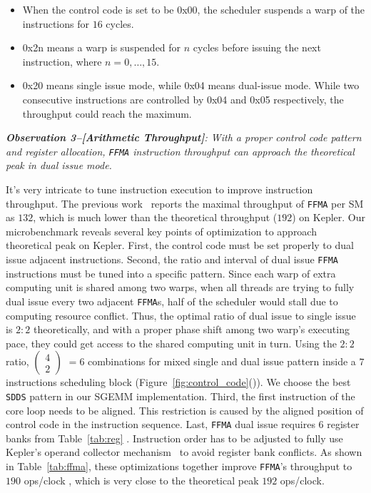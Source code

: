 \begin{itemize}
\item When the control code is set to be 0x00, the scheduler suspends a warp of the instructions for $16$ cycles.
\item 0x2n means a warp is suspended for $n$ cycles before issuing the next instruction, where $n=0, \dots, 15$.
\item 0x20 means single issue mode, while 0x04 means dual-issue mode.
While two consecutive instructions are controlled by 0x04 and 0x05 respectively, the throughput could reach the maximum.
\end{itemize}

{\em {\bf Observation 3--[Arithmetic Throughput]}:
With a proper control code pattern and register allocation, {\tt FFMA}
instruction throughput can approach the theoretical peak in dual issue mode.}

It's very intricate to tune instruction execution to improve instruction throughput. The previous work~\cite{lai}
reports the maximal throughput of {\tt FFMA} per SM as $132$, which is much lower than the theoretical throughput ($192$) on Kepler.
Our microbenchmark reveals several key points of optimization to approach theoretical peak on Kepler.
First, the control code must be set properly to dual issue adjacent instructions. Second, the ratio and interval of
dual issue {\tt FFMA} instructions must be tuned into a specific pattern.
Since each warp of extra computing unit is
shared among two warps,  when all threads are trying to fully dual issue every two adjacent {\tt FFMA}s, half of the
scheduler would stall due to computing resource conflict.
Thus, the optimal ratio of dual issue to single issue is $2:2$ theoretically, and
with a proper phase shift among two warp's executing pace, they could get access to the shared computing unit in turn. 
Using the $2:2$ ratio, \( \begin{pmatrix} 4 \\ 2 \end{pmatrix} \) $=6$ combinations for mixed single  and dual issue pattern inside a $7$ instructions scheduling block (Figure~\ref{fig:control_code}()).
We choose the best {\tt SDDS} pattern in our SGEMM implementation.
Third, the first instruction of the core loop needs to be aligned. This restriction is
caused by the aligned position of control code in the instruction sequence.
Last, {\tt FFMA} dual issue requires $6$ register banks from Table~\ref{tab:reg} .
Instruction order has to be adjusted to fully use Kepler's operand
collector mechanism~\cite{collector,tarjan2012policy} to avoid register bank conflicts.
As shown in
Table~\ref{tab:ffma}, these optimizations together improve {\tt FFMA}'s throughput to $190$ ops/clock , which is very close to the theoretical peak $192$ ops/clock.


